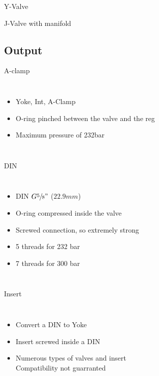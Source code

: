 \documentclass[aspectratio=1610,english,12pt]{beamer}
\begin{document}
\begin{frame}{Y-Valve}
\end{frame}

\begin{frame}{J-Valve with manifold}
\end{frame}

\subsection{Output}

\begin{frame}{A-clamp}
	\begin{columns}[onlytextwidth]
			\begin{itemize}
				\item Yoke, Int, A-Clamp
				\item O-ring pinched between the valve and the reg
				\item Maximum pressure of 232bar
			\end{itemize}
	\end{columns}
\end{frame}

\begin{frame}{DIN}
	\begin{columns}[onlytextwidth]
			\begin{itemize}
				\item DIN $G\sfrac{5}{8}"$ ($22.9mm$)
				\item O-ring compressed inside the valve
				\item Screwed connection, so extremely strong
				\item 5 threads for 232 bar
				\item 7 threads for 300 bar
			\end{itemize}	 
	\end{columns}
\end{frame}

\begin{frame}{Insert}
	\begin{columns}[onlytextwidth]
			\begin{itemize}
				\item Convert a DIN to Yoke
				\item Insert screwed inside a DIN
				\item Numerous types of valves and insert\\Compatibility not guarranted
			\end{itemize}
	\end{columns}
\end{frame}
\end{document}
